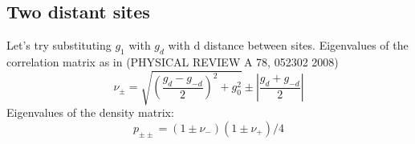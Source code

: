 \documentclass[10pt,a4paper]{article}
\begin{document}
\subsection{Two distant sites}
Let's try substituting $g_1$ with $g_d$ with d distance between sites.
Eigenvalues of the correlation matrix as in (PHYSICAL REVIEW A 78, 052302 2008)
\begin{equation}
	\nu_{\pm}=\sqrt{\left(\frac{g_{d}-g_{-d}}{2}\right)^{2}+g_{0}^{2}} \pm \left| \frac{g_{d}+g_{-d}}{2} \right|
\end{equation}
Eigenvalues of the density matrix:
\begin{equation}
	p_{\pm \pm } =(1 \pm \nu_-)(1 \pm \nu_+)/4
\end{equation}







\nocite{*}
\end{document}
